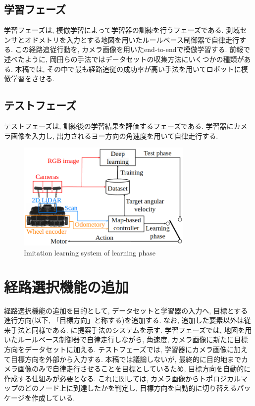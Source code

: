 \documentclass{jarticle}
\begin{document}
\subsection{学習フェーズ}
学習フェーズは, 模倣学習によって学習器の訓練を行うフェーズである. 測域センサとオドメトリを入力とする地図を用いたルールベース制御器で自律走行する. この経路追従行動を, カメラ画像を用いたend-to-endで模倣学習する. 前報\cite{okada2}で述べたように, 岡田らの手法ではデータセットの収集方法にいくつかの種類がある. 本稿では, その中で最も経路追従の成功率が高い手法を用いてロボットに模倣学習をさせる.

\subsection{テストフェーズ}
テストフェーズは, 訓練後の学習結果を評価するフェーズである. 学習器にカメラ画像を入力し, 出力されるヨー方向の角速度を用いて自律走行する.

\begin{figure}[H]
  \centering
   \includegraphics[width=85mm]{system.png}
   \vspace*{-4mm}
   \caption{Imitation learning system of learning phase}
   \label{fig: fig2}
 \end{figure}

\section{経路選択機能の追加}
経路選択機能の追加を目的として, データセットと学習器の入力へ, 目標とする進行方向(以下, 「目標方向」と称する)を追加する. なお, 追加した要素以外は従来手法と同様である. に提案手法のシステムを示す. 学習フェーズでは, 地図を用いたルールベース制御器で自律走行しながら, 角速度, カメラ画像に新たに目標方向をデータセットに加える. テストフェーズでは, 学習器にカメラ画像に加えて目標方向を外部から入力する. 本稿では議論しないが, 最終的に目的地までカメラ画像のみで自律走行させることを目標としているため, 目標方向を自動的に作成する仕組みが必要となる. これに関しては, カメラ画像からトポロジカルマップのどのノード上に到達したかを判定し, 目標方向を自動的に切り替えるパッケージを作成している\cite{graph}.
\end{document}
